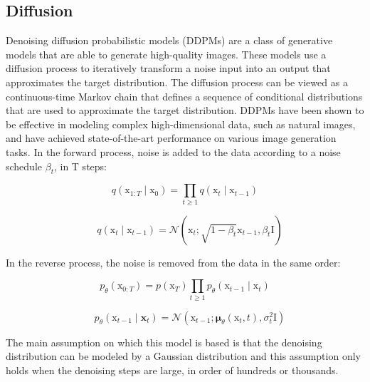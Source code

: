 \documentclass[10pt,twocolumn,letterpaper]{article}
\begin{document}
\subsection{Diffusion}

Denoising diffusion probabilistic models (DDPMs) \cite{sohldickstein2015deep,NEURIPS2020_4c5bcfec} are a class of generative models that are able to generate high-quality images.
These models use a diffusion process to iteratively transform a noise input into an output that approximates the target distribution.
The diffusion process can be viewed as a continuous-time Markov chain that defines a sequence of conditional distributions that are used to approximate the target distribution.
DDPMs have been shown to be effective in modeling complex high-dimensional data, such as natural images, and have achieved state-of-the-art performance on various image generation tasks.
In the forward process, noise is added to the data according to a noise schedule $\beta_t$, in T steps:

\begin{equation}
    q\left(\mathrm{x}_{1: T} \mid \mathrm{x}_0\right)=\prod_{t \geq 1} q\left(\mathrm{x}_t \mid \mathrm{x}_{t-1}\right)
\end{equation}

\begin{equation}
    \quad q\left(\mathrm{x}_t \mid \mathrm{x}_{t-1}\right)=\mathcal{N}\left(\mathrm{x}_t ; \sqrt{1-\beta_t} \mathrm{x}_{t-1}, \beta_t \mathrm{I}\right)
\end{equation}

In the reverse process, the noise is removed from the data in the same order:

\begin{equation}
    p_\theta\left(\mathrm{x}_{0: T}\right)=p\left(\mathrm{x}_T\right) \prod_{t \geq 1} p_\theta\left(\mathrm{x}_{t-1} \mid \mathrm{x}_t\right)
\end{equation}

\begin{equation}
    \quad p_\theta\left(\mathrm{x}_{t-1} \mid \mathbf{x}_t\right)=\mathcal{N}\left(\mathrm{x}_{t-1} ; \boldsymbol{\mu}_\theta\left(\mathrm{x}_t, t\right), \sigma_t^2 \mathrm{I}\right)
\end{equation}

The main assumption on which this model is based is that the denoising distribution can be modeled by a Gaussian distribution and this assumption
only holds when the denoising steps are large, in order of hundreds or thousands.
\end{document}
